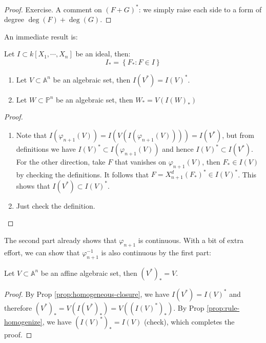 \documentclass{note-eng}
\begin{document}
\begin{proof}
    Exercise. A comment on $(F + G)^\ast$: we simply raise each side to a form of degree $\deg(F) + \deg(G)$.
\end{proof}

An immediate result is:

\begin{proposition}
    Let $I \subset k[X_1, \cdots, X_n]$ be an ideal, then:
    $$I_\ast = \left\lbrace F_\ast: F \in I \right\rbrace$$
\end{proposition}

\begin{proposition} \label{prop:homogeneous-closure}
    \begin{enumerate}
        \item Let $V \subset \mathbb{A}^n$ be an algebraic set, then $I(V^\ast) = I(V)^\ast$.
        \item Let $W \subset \mathbb{P}^n$ be an algebraic set, then $W_\ast = V(I(W)_\ast)$
    \end{enumerate}
\end{proposition}

\begin{proof}
    \begin{enumerate}
        \item Note that $I(\varphi_{n + 1}(V)) = I(V(I(\varphi_{n + 1}(V)))) = I(V^\ast)$, but from definitions we have $I(V)^\ast \subset I(\varphi_{n + 1}(V))$ and hence $I(V)^\ast \subset I(V^\ast)$. For the other direction, take $F$ that vanishes on $\varphi_{n + 1}(V)$, then $F_\ast \in I(V)$ by checking the definitions. It follows that $F = X_{n + 1}^d(F_\ast)^\ast \in I(V)^\ast$. This shows that $I(V^\ast) \subset I(V)^\ast$.
        \item Just check the definition.
    \end{enumerate}
\end{proof}

The second part already shows that $\varphi_{n + 1}$ is continuous. With a bit of extra effort, we can show that $\varphi_{n + 1} ^{-1}$ is also continuous by the first part:

\begin{proposition} \label{prop:affine-proj-correspondence}
    Let $V \subset \mathbb{A}^n$ be an affine algebraic set, then $(V^\ast)_\ast = V$.
\end{proposition}

\begin{proof}
    By Prop \ref{prop:homogeneous-closure}, we have $I(V^\ast) = I(V)^\ast$ and therefore $(V^\ast)_\ast = V(I(V^\ast)_\ast) = V((I(V)^\ast)_\ast)$. By Prop \ref{prop:rule-homogenize}, we have $(I(V)^\ast)_\ast = I(V)$ (check), which completes the proof.
\end{proof}
\end{document}
